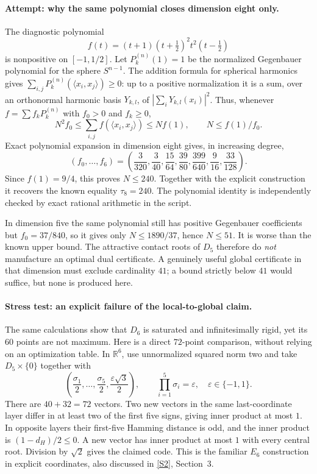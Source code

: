 \documentclass[11pt,a4paper]{article}
\newcommand{\R}{\mathbb{R}}
\newcommand{\sref}[2]{\hyperlink{source:#1:#2}{[S#2]}}
\numberwithin{equation}{section}
\begin{document}
\paragraph{Attempt: why the same polynomial closes dimension eight only.}
The diagnostic polynomial
\[
 f(t)=(t+1)(t+\tfrac12)^2t^2(t-\tfrac12)
\]
is nonpositive on $[-1,1/2]$. Let $P_k^{(n)}(1)=1$ be the normalized
Gegenbauer polynomial for the sphere $S^{n-1}$. The addition formula for
spherical harmonics gives
$\sum_{i,j}P_k^{(n)}(\langle x_i,x_j\rangle)\geq0$:
up to a positive normalization it is a sum, over an orthonormal harmonic
basis $Y_{k,l}$, of $|\sum_iY_{k,l}(x_i)|^2$.
Thus, whenever $f=\sum f_kP_k^{(n)}$ with $f_0>0$ and $f_k\geq0$,
\[
 N^2f_0\leq\sum_{i,j}f(\langle x_i,x_j\rangle)\leq Nf(1),
 \qquad N\leq f(1)/f_0.
\]
Exact polynomial expansion in dimension eight gives, in increasing degree,
\[
 (f_0,\ldots,f_6)=
 \left(\frac3{320},\frac3{40},\frac{15}{64},\frac{39}{80},
       \frac{399}{640},\frac9{16},\frac{33}{128}\right).
\]
Since $f(1)=9/4$, this proves $N\leq240$. Together with the explicit
construction it recovers the known equality $\tau_8=240$.
The polynomial identity is independently checked by exact rational
arithmetic in the script.

In dimension five the same polynomial still has positive Gegenbauer
coefficients but $f_0=37/840$, so it gives only
$N\leq1890/37$, hence $N\leq51$. It is worse than the known upper bound.
The attractive contact roots of $D_5$ therefore do \emph{not} manufacture
an optimal dual certificate. A genuinely useful global certificate in
that dimension must exclude cardinality $41$; a bound strictly below $41$
would suffice, but none is produced here.

\paragraph{Stress test: an explicit failure of the local-to-global claim.}
The same calculations show that $D_6$ is saturated and infinitesimally
rigid, yet its $60$ points are not maximum. Here is a direct $72$-point
comparison, without relying on an optimization table. In $\R^6$, use
unnormalized squared norm two and take $D_5\times\{0\}$ together with
\[
 \left(\frac{\sigma_1}2,\ldots,\frac{\sigma_5}2,
               \frac{\varepsilon\sqrt3}2\right),
 \qquad \prod_{i=1}^5\sigma_i=\varepsilon,
 \quad \varepsilon\in\{-1,1\}.
\]
There are $40+32=72$ vectors. Two new vectors in the same last-coordinate
layer differ in at least two of the first five signs, giving inner product
at most $1$. In opposite layers their first-five Hamming distance is odd,
and the inner product is $(1-d_H)/2\leq0$. A new vector has inner product
at most $1$ with every central root. Division by $\sqrt2$ gives the
claimed code. This is the familiar $E_6$ construction in explicit
coordinates, also discussed in \sref{110}{2}, Section~3.
\end{document}
